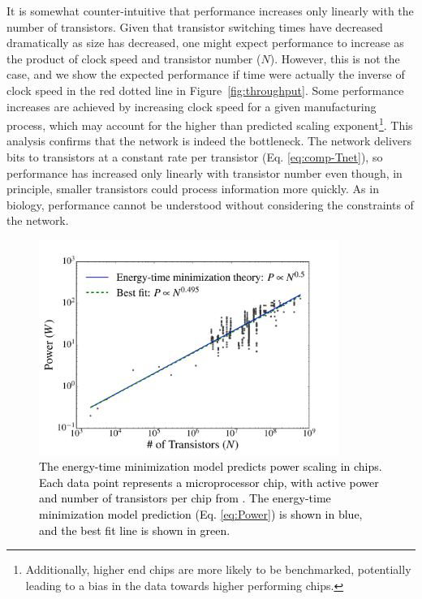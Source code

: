 \documentclass[12pt]{article}
\newcommand{\red}[1]{\textcolor{black}{#1}}
\begin{document}
It is somewhat counter-intuitive that
performance increases only linearly with the number of transistors.
Given that transistor switching times have decreased
dramatically as size has decreased, one might expect performance to increase as
the product of clock speed and transistor number ($N$).  However, this
is not the case, and we show
the expected performance if time were actually the inverse of clock
speed in the red dotted line in Figure~\ref{fig:throughput}. Some performance
increases are achieved by increasing clock speed for a given manufacturing
process, which may account for the higher than predicted scaling
exponent\footnote{Additionally, higher end chips are more likely to be
benchmarked, potentially leading to a bias in the data towards higher
performing chips.}. This analysis confirms that the network is indeed the
bottleneck. The network delivers bits to transistors at a constant rate per
transistor (Eq. \ref{eq:comp-Tnet}), so performance has increased only linearly
with transistor number even though, in principle, smaller transistors could process
information more quickly.  As in biology, performance cannot be understood
without considering the constraints of the network.


\begin{figure}[!h]
\centering
\includegraphics[height=70mm]{Figures/ChipsPowerScaling.pdf}
\caption{\red{The energy-time minimization model predicts power
scaling in chips. Each data point represents a microprocessor chip, with active power and number of transistors per chip from \cite{moses08}.  The energy-time minimization model
prediction (Eq. \ref{eq:Power}) is shown in blue, and the best fit line is shown in green.}}
\label{fig:power}
\end{figure}
\end{document}
